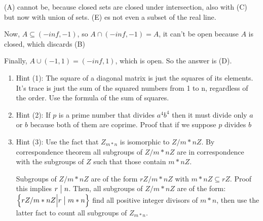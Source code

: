 \documentclass[12pt]{report}
\theoremstyle{largebreak}
\newcommand\divides{\ensuremath{\bigm|}}
\begin{document}
    \begin{sol}
        (A) cannot be, because closed sets are closed under intersection, also with (C) but now with union of sets. (E) es not even a subset of the real line.

        Now, $A\subseteq (-inf,-1)$, so $A\cap(-inf,-1)=A$, it can't be open because $A$ is closed, which discards (B)

        Finally, $A\cup(-1,1)=(-inf,1)$, which is open. So the answer is (D).
    \end{sol}

    \begin{enumerate}
        \item Hint (1): The square of a diagonal matrix is just the squares of its elements. It's trace is just the sum of the squared numbers from 1 to n, regardless of the order. Use the formula of the sum of squares.
        \item Hint (2): If \(p\) is a prime number that divides \(a^4b^4\) then it must divide only \(a\) or \(b\) because both of them are coprime. Proof that if we suppose \(p\) divides \(b\) 
        \item Hint (3): Use the fact that $Z_{m*n}$ is isomorphic to $Z/m*nZ$. By correspondence theorem all subgroups of $Z/m*nZ$ are in correspondence with the subgroups of $Z$ such that those contain $m*nZ$.
        
        Subgroups of $Z/m*nZ$ are of the form $rZ/m*nZ$ with $m*nZ\subseteq rZ$. Proof this implies $r\divides n$. Then, all subgroups of $Z/m*nZ$ are of the form:
        $\left\{rZ/m*nZ\Big|r\divides m*n \right\}$ find all positive integer divisors of $m*n$, then use the latter fact to count all subgroups of $Z_{m*n}$. 
    \end{enumerate}

    \setcounter{section}{2}

    \begin{excer}
        
    \end{excer}
\end{document}
